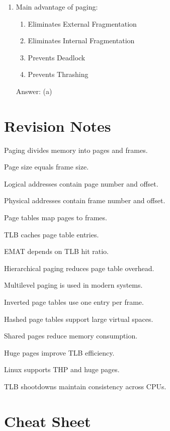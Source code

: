 \begin{enumerate}
\item Main advantage of paging:
\begin{enumerate}[label=(\alph*)]
\item Eliminates External Fragmentation
\item Eliminates Internal Fragmentation
\item Prevents Deadlock
\item Prevents Thrashing
\end{enumerate}
Answer: (a)
\end{enumerate}

\section{Revision Notes}

\begin{revisionnotes}
\item Paging divides memory into pages and frames.
\item Page size equals frame size.
\item Logical addresses contain page number and offset.
\item Physical addresses contain frame number and offset.
\item Page tables map pages to frames.
\item TLB caches page table entries.
\item EMAT depends on TLB hit ratio.
\item Hierarchical paging reduces page table overhead.
\item Multilevel paging is used in modern systems.
\item Inverted page tables use one entry per frame.
\item Hashed page tables support large virtual spaces.
\item Shared pages reduce memory consumption.
\item Huge pages improve TLB efficiency.
\item Linux supports THP and huge pages.
\item TLB shootdowns maintain consistency across CPUs.
\end{revisionnotes}

\section{Cheat Sheet}


